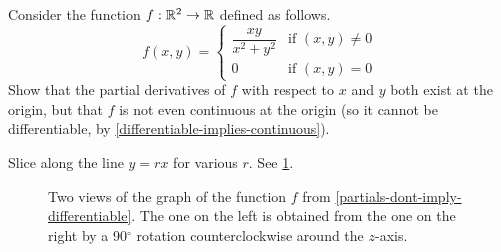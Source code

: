 \begin{exercise} \label{partials-dont-imply-differentiable}
	Consider the function $f : \mathbb{R}^2 \to \mathbb{R}$ defined as follows.
	\[ f(x, y) = \begin{cases} \dfrac{x y}{x^2 + y^2} &  \text{if } (x, y) \neq 0 \\ 0 & \text{if } (x, y) = 0 \end{cases} \]
	Show that the partial derivatives of $f$ with respect to $x$ and $y$ both exist at the origin, but that $f$ is not even continuous at the origin (so it cannot be differentiable, by \cref{differentiable-implies-continuous}). 
	\begin{hint} Slice along the line $y = rx$ for various $r$. See \cref{partials-dont-imply-differentiable-graph}. \end{hint}
	\begin{figure}[ht]
		\begin{center}
		\end{center}
		\caption{Two views of the graph of the function $f$ from \cref{partials-dont-imply-differentiable}. The one on the left is obtained from the one on the right by a 90$^\circ$ rotation counterclockwise around the $z$-axis.} \label{partials-dont-imply-differentiable-graph}
	\end{figure}
\end{exercise}

